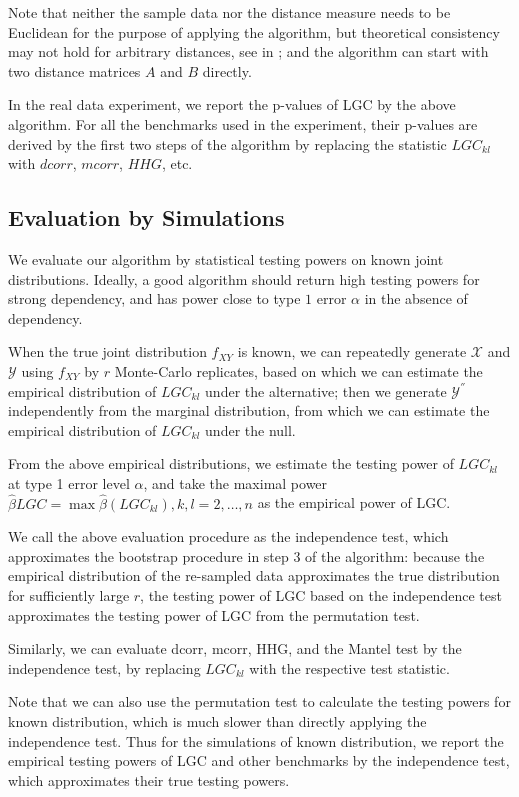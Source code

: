\documentclass[11pt]{article}
\begin{document}
Note that neither the sample data nor the distance measure needs to be Euclidean for the purpose of applying the algorithm, but theoretical consistency may not hold for arbitrary distances, see in \cite{Lyons2013}; and the algorithm can start with two distance matrices $A$ and $B$ directly.

In the real data experiment, we report the p-values of LGC by the above algorithm. For all the benchmarks used in the experiment, their p-values are derived by the first two steps of the algorithm by replacing the statistic $LGC_{kl}$ with $dcorr$, $mcorr$, $HHG$, etc. 

\subsection{Evaluation by Simulations}

We evaluate our algorithm by statistical testing powers on known joint distributions. Ideally, a good algorithm should return high testing powers for strong dependency, and has power close to type $1$ error $\alpha$ in the absence of dependency.

When the true joint distribution $f_{XY}$ is known, we can repeatedly generate $\mathcal{X}$ and $\mathcal{Y}$ using $f_{XY}$ by $r$ Monte-Carlo replicates, based on which we can estimate the empirical distribution of $LGC_{kl}$ under the alternative; then we generate $\mathcal{Y}^{''}$ independently from the marginal distribution, from which we can estimate the empirical distribution of $LGC_{kl}$ under the null.

From the above empirical distributions, we estimate the testing power of $LGC_{kl}$ at type 1 error level $\alpha$, and take the maximal power $\hat{\beta}{LGC}=\max{\hat{\beta}(LGC_{kl}), k,l=2, \ldots,n}$ as the empirical power of LGC. 

We call the above evaluation procedure as the independence test, which approximates the bootstrap procedure in step 3 of the algorithm: because the empirical distribution of the re-sampled data approximates the true distribution for sufficiently large $r$, the testing power of LGC based on the independence test approximates the testing power of LGC from the permutation test.

Similarly, we can evaluate dcorr, mcorr, HHG, and the Mantel test by the independence test, by replacing $LGC_{kl}$ with the respective test statistic. 

Note that we can also use the permutation test to calculate the testing powers for known distribution, which is much slower than directly applying the independence test.
Thus for the simulations of known distribution, we report the empirical testing powers of LGC and other benchmarks by the independence test, which approximates their true testing powers.
\end{document}
